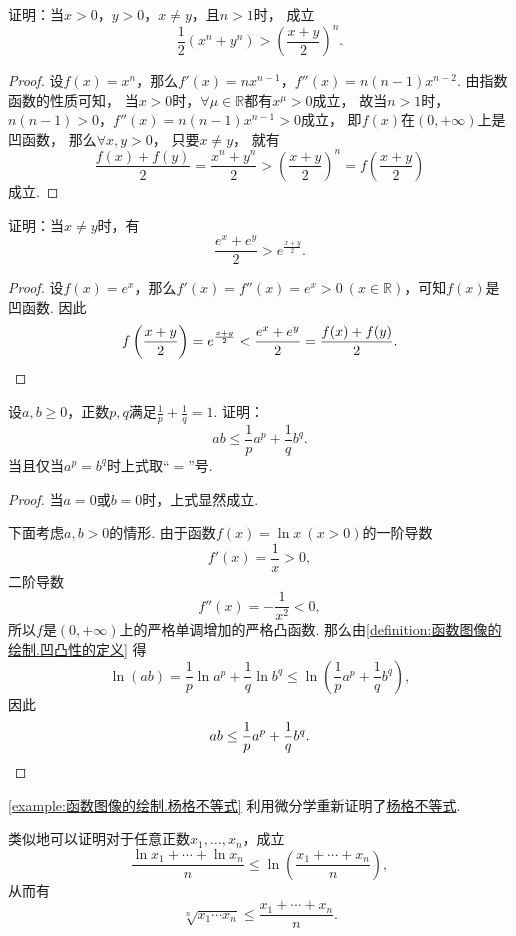 \begin{example}
证明：当\(x>0\)，\(y>0\)，\(x \neq y\)，且\(n>1\)时，
成立\begin{equation}\label{equation:微分中值定理.平均数的比较1}
	\frac{1}{2} (x^n+y^n) > \left(\frac{x+y}{2}\right)^n.
\end{equation}
\begin{proof}
设\(f(x) = x^n\)，那么\(f'(x) = n x^{n-1}\)，\(f''(x) = n(n-1) x^{n-2}\).
由指数函数的性质可知，
当\(x > 0\)时，\(\forall \mu \in \mathbb{R}\)都有\(x^{\mu} > 0\)成立，
故当\(n > 1\)时，\(n(n-1)>0\)，\(f''(x) = n(n-1) x^{n-1} > 0\)成立，
即\(f(x)\)在\((0,+\infty)\)上是凹函数，
那么\(\forall x,y>0\)，
只要\(x \neq y\)，
就有\[
	\frac{f(x)+f(y)}{2} = \frac{x^n+y^n}{2}
	> \left(\frac{x+y}{2}\right)^n = f\left(\frac{x+y}{2}\right)
\]成立.
\end{proof}
\end{example}

\begin{example}
证明：当\(x \neq y\)时，有\begin{equation}
	\frac{e^x + e^y}{2} > e^{\frac{x+y}{2}}.
\end{equation}
\begin{proof}
设\(f(x) = e^x\)，那么\(f'(x) = f''(x) = e^x > 0\ (x\in\mathbb{R})\)，可知\(f(x)\)是凹函数.
因此\[
	f\left(\frac{x+y}{2}\right) = e^{\frac{x+y}{2}}
	< \frac{e^x+e^y}{2} = \frac{f(x)+f(y)}{2}.
	\qedhere
\]
\end{proof}
\end{example}

\begin{example}[杨格不等式]\label{example:函数图像的绘制.杨格不等式}
设\(a,b\geq0\)，正数\(p,q\)满足\(\frac1p+\frac1q=1\).
证明：\[
	a b \leq \frac1p a^p + \frac1q b^q.
\]
当且仅当\(a^p = b^q\)时上式取“\(=\)”号.
\begin{proof}
当\(a=0\)或\(b=0\)时，上式显然成立.

下面考虑\(a,b>0\)的情形.
由于函数\(f(x) = \ln x\ (x>0)\)的一阶导数\[
	f'(x) = \frac1x > 0,
\]
二阶导数\[
	f''(x) = -\frac1{x^2} < 0,
\]
所以\(f\)是\((0,+\infty)\)上的严格单调增加的严格凸函数.
那么由\cref{definition:函数图像的绘制.凹凸性的定义} 得\[
	\ln(ab) = \frac1p \ln a^p + \frac1q \ln b^q
	\leq \ln\left( \frac1p a^p + \frac1q b^q \right),
\]
因此\[
	ab \leq \frac1p a^p + \frac1q b^q.
	\qedhere
\]
\end{proof}
\end{example}
\begin{remark}
\cref{example:函数图像的绘制.杨格不等式}
利用微分学重新证明了\hyperref[theorem:不等式.杨格不等式]{杨格不等式}.
\end{remark}
\begin{remark}
类似地可以证明对于任意正数\(x_1,\dotsc,x_n\)，成立\[
	\frac{\ln x_1 + \dotsb + \ln x_n}{n}
	\leq \ln\left( \frac{x_1 + \dotsb + x_n}{n} \right),
\]
从而有\[
	\sqrt[n]{x_1 \dotsm x_n}
	\leq \frac{x_1 + \dotsb + x_n}{n}.
\]
\end{remark}

